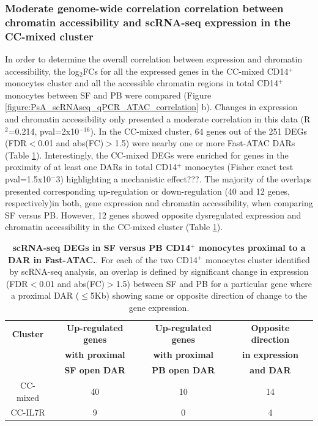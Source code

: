 \subsubsection{Moderate genome-wide correlation correlation between chromatin accessibility and scRNA-seq expression in the CC-mixed cluster }
In order to determine the overall correlation between expression and chromatin accessibility, the log$_2$FCs for all the expressed genes in the CC-mixed CD14$^+$ monocytes cluster and all the accessible chromatin regions in total CD14$^+$ monocytes between SF and PB were compared (Figure \ref{figure:PsA_scRNAseq_qPCR_ATAC_correlation} b). Changes in expression and chromatin accessibility only presented a moderate correlation in this data (R$^2$=0.214, pval=2x10$^{-16}$). In the CC-mixed cluster, 64 genes out of the 251 DEGs (FDR$<$0.01 and abs(FC)$>$1.5) were nearby one or more Fast-ATAC DARs (Table \ref{tab:PSA_10X_CD14_clusters_and_ATAC_overlap}). Interestingly, the CC-mixed DEGs were enriched for genes in the proximity of at least one DARs in total CD14$^+$ monocytes (Fisher exact test pval=1.5x10$^-3$) highlighting a mechanistic effect???. The majority of the overlaps presented corresponding up-regulation or down-regulation (40 and 12 genes, respectively)in both, gene expression and chromatin accessibility, when comparing SF versus PB. However, 12 genes showed opposite dysregulated expression and chromatin accessibility in the CC-mixed cluster (Table \ref{tab:PSA_10X_CD14_clusters_and_ATAC_overlap}). 


  
\begin{table}[htbp]
\centering
\begin{tabular}{@{} c c c c}
\toprule
\textbf{Cluster} & \textbf{Up-regulated genes}        &  \textbf{Up-regulated genes }  & \textbf{Opposite direction} \\
                   & \textbf{with proximal}           &  \textbf{with proximal}      & \textbf{in expression } \\
									 &	\textbf{SF open DAR}				    &  \textbf{PB open DAR}        & \textbf{and DAR}\\
\midrule
\midrule
 CC-mixed         & 40                                       &  10                                & 14 \\
 CC-IL7R          & 9                                        &  0                                 & 4 \\
\bottomrule
\end{tabular}
\medskip %
\caption[scRNA-seq DEGs in SF versus PB CD14$^+$ monocytes proximal to a DAR in Fast-ATAC.]{\textbf{scRNA-seq DEGs in SF versus PB CD14$^+$ monocytes proximal to a DAR in Fast-ATAC.}. For each of the two CD14$^+$ monocytes cluster identified by scRNA-seq analysis, an overlap is defined by significant change in expression (FDR$<$0.01 and abs(FC)$>$1.5) between SF and PB for a particular gene where a proximal DAR ($\leq$5Kb) showing same or opposite direction of change to the gene expression.}
\label{tab:PSA_10X_CD14_clusters_and_ATAC_overlap}
\end{table}


